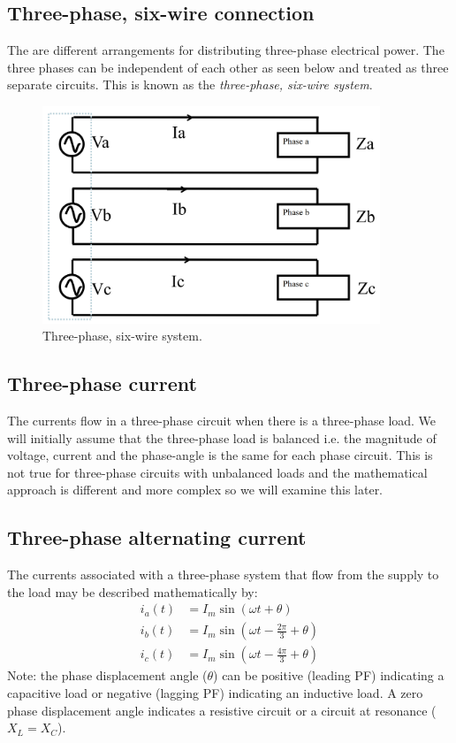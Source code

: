 \subsection{Three-phase, six-wire connection}
The are different arrangements for distributing three-phase electrical power. The three phases can be independent of each other as seen below and treated as three separate circuits. This is known as the \textit{three-phase, six-wire system}.
\begin{figure}[H]
	\centering
	\includegraphics[width = 0.9\textwidth]{./img/figure6.png}
	\caption{Three-phase, six-wire system.}
\end{figure}
\subsection{Three-phase current}
\begin{quoting}
	The currents flow in a three-phase circuit when there is a three-phase load. We will initially assume that the three-phase load is balanced i.e. the magnitude of voltage, current and the phase-angle is the same for each phase circuit. This is not true for three-phase circuits with unbalanced loads and the mathematical approach is different and more complex so we will examine this later.
\end{quoting}
\subsection{Three-phase alternating current}
The currents associated with a three-phase system that flow from the supply to the load may be described mathematically by:
\begin{align}
	i_a \left(t\right) & = I_m \sin \left( \omega t + \theta \right)                \\
	i_b \left(t\right) & = I_m \sin \left( \omega t - \frac{2\pi}{3} +\theta\right) \\
	i_c \left(t\right) & = I_m \sin \left( \omega t - \frac{4\pi}{3} +\theta\right)
\end{align}
Note: the phase displacement angle ($\theta$) can be positive (leading PF) indicating a capacitive load or negative (lagging PF) indicating an inductive load. A zero phase displacement angle indicates a resistive circuit or a circuit at resonance ($X_L = X_C$).
